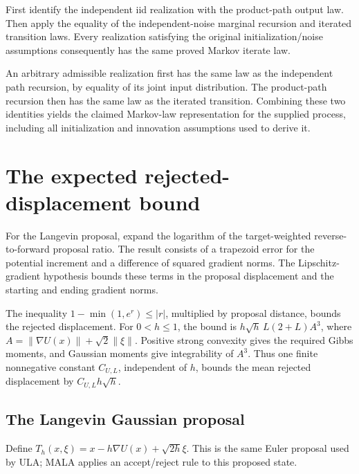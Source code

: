 \documentclass[11pt,a4paper]{report}
\begin{document}
First identify the independent iid realization with the product-path output law. Then apply the equality of the independent-noise marginal recursion and iterated transition laws. Every realization satisfying the original initialization/\allowbreak{}noise assumptions consequently has the same proved Markov iterate law.



An arbitrary admissible realization first has the same law as the independent path recursion, by equality of its joint input distribution. The product-path recursion then has the same law as the iterated transition. Combining these two identities yields the claimed Markov-law representation for the supplied process, including all initialization and innovation assumptions used to derive it.

\section{\texorpdfstring{The expected rejected-displacement bound}{The expected rejected-displacement bound}}
\label{proof-module-UnadjustedLangevin-MALAError-lean}


For the Langevin proposal, expand the logarithm of the target-weighted reverse-to-forward proposal ratio. The result consists of a trapezoid error for the potential increment and a difference of squared gradient norms. The Lipschitz-gradient hypothesis bounds these terms in the proposal displacement and the starting and ending gradient norms.



The inequality \(1-\min(1,e^r)\le|r|\), multiplied by proposal distance, bounds the rejected displacement. For \(0<h\le1\), the bound is \(h\sqrt h\,L(2+L)A^3\), where \(A=\|\nabla U(x)\|+\sqrt2\|\xi\|\). Positive strong convexity gives the required Gibbs moments, and Gaussian moments give integrability of \(A^3\). Thus one finite nonnegative constant \(C_{U,L}\), independent of \(h\), bounds the mean rejected displacement by \(C_{U,L}h\sqrt h\).

\subsection{\texorpdfstring{The Langevin Gaussian proposal}{The Langevin Gaussian proposal}}
\label{report-step-UnadjustedLangevin-MALAError-lean-1}


Define \(T_h(x,\xi)=x-h\nabla U(x)+\sqrt{2h}\xi\). This is the same Euler proposal used by ULA; MALA applies an accept/\allowbreak{}reject rule to this proposed state.
\end{document}
